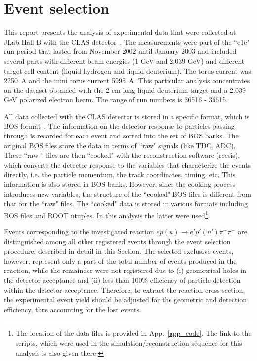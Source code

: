 \chapter{Event selection}
\label{Sect:select}


This report presents the analysis of experimental data that were collected at JLab Hall B with the CLAS detector~\cite{Mecking:2003zu}. The measurements were part of the ``e1e" run period that lasted from November 2002 until January 2003 and included several parts with different beam energies (1 GeV and 2.039 GeV) and different target cell content (liquid hydrogen and liquid deuterium). The torus current was 2250~A and the mini torus current 5995~A. This particular analysis concentrates on the dataset obtained with the 2-cm-long liquid deuterium target and a 2.039 GeV polarized electron beam. The range of run numbers is 36516 - 36615. 

All data collected with the CLAS detector is stored in a specific format, which is BOS format~\cite{BOS:bank,Stepanyan:1999}. The information on the detector response to particles passing through is recorded for each event and sorted into the set of BOS banks. The original BOS files store the data in terms of ``raw" signals (like TDC, ADC). These ``raw '' files are then ``cooked" with the reconstruction software (recsis), which converts the detector response to the variables that characterize the events directly, i.e. the particle momentum, the track coordinates, timing, etc. This information is also stored in BOS banks. However, since the cooking process introduces new variables, the structure of the ``cooked" BOS files is different from that for the ``raw" files. The ``cooked" data is stored in various formats including BOS files and ROOT ntuples. In this analysis the latter were used\footnote[1]{The location of the data files is provided in App.~\ref{app_code}. The link to the scripts, which were used in the simulation/reconstruction sequence for this analysis is also given there.}.

Events corresponding to the investigated reaction $ep(n) \rightarrow e'p'(n')\pi^{+}\pi^{-}$ are distinguished among all other registered events through the event selection procedure, described in detail in this Section.  The selected exclusive events,  however, represent only a part of the total number of events produced in the reaction, while the remainder were not registered due to (i) geometrical holes in the detector acceptance and (ii) less than 100\% efficiency of particle detection within the detector acceptance. Therefore, to extract the reaction cross section, the experimental event yield should be adjusted for the geometric and detection efficiency, thus accounting for the lost events.

